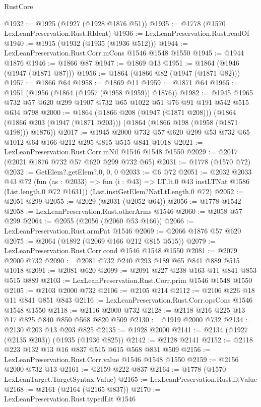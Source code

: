 \begin{lexlean}{RustCore}
\begin{coremodule}
@1932 := @1925 (@1927 (@1928 @1876 @51))
@1935 := @1778 (@1570 LexLeanPreservation.Rust.RIdent)
@1936 := LexLeanPreservation.Rust.readOf
@1940 := @1915 (@1932 (@1935 (@1936 @512)))
@1944 := LexLeanPreservation.Rust.Corr.mCons @1546 @1548 @1550
@1945 := @1944 @1876
@1946 := @1866 @87
@1947 := @1869 @13
@1951 := @1864 (@1946 (@1947 (@1871 @87)))
@1956 := @1864 (@1866 @82 (@1947 (@1871 @82)))
@1957 := @1866 @64
@1958 := @1869 @11
@1959 := @1871 @64
@1965 := @1951 (@1956 (@1864 (@1957 (@1958 @1959)) @1876))
@1982 := @1945 @1965 @732 @57 @620 @299 @1907 @732 @65 @1022 @51 @76 @91 @191 @542 @515 @634 @798
@2000 := @1864
    (@1866 @208 (@1947 (@1871 @208)))
    (@1864 (@1866 @203 (@1947 (@1871 @203))) (@1864 (@1866 @198 (@1958 (@1871 @198))) @1876))
@2017 := @1945 @2000 @732 @57 @620 @299 @53 @732 @65 @1012 @64 @166 @212 @295 @815 @515 @841 @1018
@2021 := LexLeanPreservation.Rust.Corr.mNil @1546 @1548 @1550
@2029 := @2017 (@2021 @1876 @732 @57 @620 @299 @732 @65)
@2031 := @1778 (@1570 @72)
@2032 := GetElem?.getElem?.{0, 0, 0}
@2033 := @6 @72
@2051 := @2032
    @2033
    @43
    @72
    (fun (as : @2033) => fun (i : @43) => LT.lt.{0} @43 instLTNat @1586 (List.length.{0} @72 @1631))
    (List.instGetElem?NatLtLength.{0} @72)
@2052 := @2051 @299
@2055 := @2029 (@2031 (@2052 @64))
@2056 := @1778 @1542
@2058 := LexLeanPreservation.Rust.otherArms @1546
@2060 := @2058 @57 @299
@2064 := @2055 (@2056 (@2060 @53 @166))
@2066 := LexLeanPreservation.Rust.armPat @1546
@2069 := @2066 @1876 @57 @620
@2075 := @2064 (@1892 (@2069 @166 @212 @815 @515))
@2079 := LexLeanPreservation.Rust.Corr.cond @1546 @1548 @1550
@2081 := @2079 @2000 @732
@2090 := @2081 @732 @240 @293 @189 @65 @841 @889 @515 @1018
@2091 := @2081 @620
@2099 := @2091 @227 @238 @163 @11 @841 @853 @515 @889
@2103 := LexLeanPreservation.Rust.Corr.prim @1546 @1548 @1550
@2105 := @2103 @2000 @732
@2106 := @2105 @214
@2112 := @2106 @226 @18 @11 @841 @851 @843
@2116 := LexLeanPreservation.Rust.Corr.opsCons @1546 @1548 @1550
@2118 := @2116 @2000 @732
@2128 := @2118 @216 @225 @13 @17 @825 @840 @850 @568 @820 @509
@2130 := @1919 @2000 @732
@2134 := @2130 @203 @13 @203 @825
@2135 := @1928 @2000
@2141 := @2134 (@1927 (@2135 @203)) (@1935 (@1936 @825))
@2142 := @2128 @2141
@2152 := @2118 @223 @132 @13 @16 @837 @515 @615 @568 @831 @509
@2156 := LexLeanPreservation.Rust.Corr.value @1546 @1548 @1550
@2159 := @2156 @2000 @732 @13
@2161 := @2159 @222 @837
@2164 := @1778 (@1570 LexLeanTarget.TargetSyntax.Value)
@2165 := LexLeanPreservation.Rust.litValue
@2168 := @2161 (@2164 (@2165 @837))
@2170 := LexLeanPreservation.Rust.typedLit @1546

\end{coremodule}
\end{lexlean}
